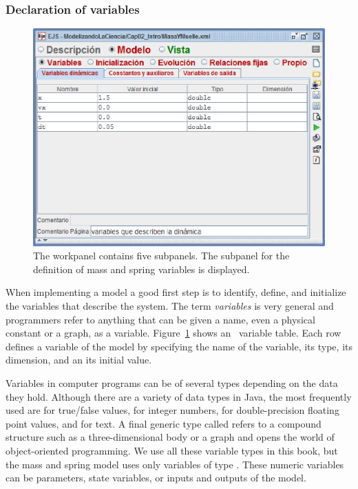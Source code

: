 \subsubsection{Declaration of variables}
\begin{figure}[htb]
    \centering
  \includegraphics[scale=\scale]{02EjsIntro/images/ModelVariables.eps}
    \caption{The  workpanel contains five subpanels. The subpanel for the definition of mass and spring variables is displayed.}
    \label{fig:02EjsIntro/ModelVariables}
\end{figure}

When implementing a model a good first step is to identify, define, and initialize the variables that describe the
system. The term \emph{variables} is very general and programmers refer to anything that can be given a name, even a
physical constant or a graph, as a variable. Figure~\ref{fig:02EjsIntro/ModelVariables} shows an
\ejs\ variable table. Each row defines a variable of the model by specifying the name of the variable, its type, its dimension, and
an its initial value.

Variables in computer programs can be of several types depending on the data they hold. Although there are a variety of
data types in Java, the most frequently used are  for true/false values,  for integer
numbers,  for double-precision floating point values, and  for text. A final generic type
called  refers to a compound structure such as a three-dimensional body or a graph and opens the world of object-oriented programming.
We use all these variable types in this book, but the mass and spring model uses only variables of type .
These numeric variables can be parameters,  state variables, or
inputs and outputs of the model.

